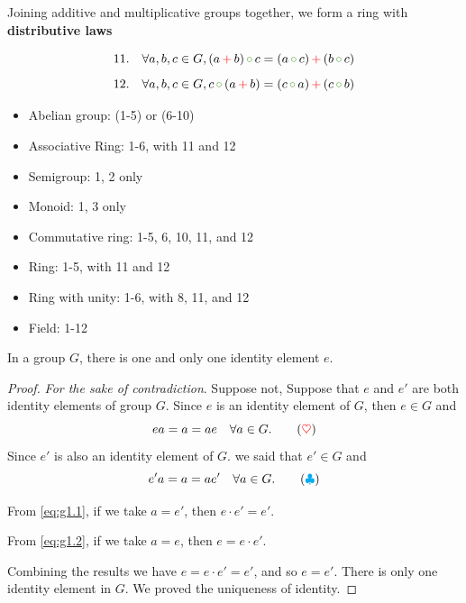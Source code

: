 Joining additive and multiplicative groups together, we form a ring with \textbf{distributive laws}

\[11. \quad \forall a, b, c \in G, (a \, {\color{red} +}\, b) \, {\color{extinctGreen} \circ}\, c = (a \, {\color{extinctGreen} \circ}\, c) \, {\color{red} +}\, (b \, {\color{extinctGreen} \circ}\, c)  \]
\[12. \quad \forall a, b, c \in G, c \, {\color{extinctGreen} \circ}\, (a \, {\color{red} +}\, b) = (c \, {\color{extinctGreen} \circ}\, a) \, {\color{red} +}\, (c \, {\color{extinctGreen} \circ}\, b)  \]

\begin{itemize}
    \item Abelian group: (1-5) or (6-10)
    \item Associative Ring: 1-6, with 11 and 12
    \item Semigroup: 1, 2 only
    \item Monoid: 1, 3 only
    \item Commutative ring: 1-5, 6, 10, 11, and 12
    \item Ring: 1-5, with 11 and 12
    \item Ring with unity: 1-6, with 8, 11, and 12
    \item Field: 1-12
\end{itemize}

\begin{lemma}
    In a group $G$, there is one and only one identity element $e$.
\end{lemma}
\begin{proof}
    \textit{For the sake of contradiction}. Suppose not, Suppose that $e$ and $e'$ are both identity elements of group $G$.
    Since $e$ is an identity element of $G$, then $e \in G$ and 
    \begin{equation*}
        ea= a = ae \quad \forall a \in G.  \label{eq:g1.1} \tag{{\color{red} $\heartsuit$}}
    \end{equation*}
    Since $e'$ is also an identity element of $G$. we said that $e' \in G$ and 
    \begin{equation*}
        e'a= a = ae' \quad \forall a \in G.  \label{eq:g1.2} \tag{{\color{cyan} $\clubsuit$}}
    \end{equation*}

    From \eqref{eq:g1.1}, if we take $a = e'$, then $e \cdot e' = e'$. 

    From \eqref{eq:g1.2}, if we take $a = e$, then $e = e \cdot e'$.
    
    Combining the results we have $e = e \cdot e' = e'$, and so $e = e'$. There is only one identity element 
    in $G$. We proved the uniqueness of identity.
\end{proof}

